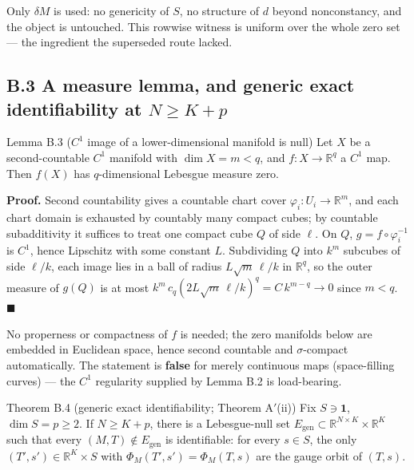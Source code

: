 Only $\delta M$ is used: no genericity of $S$, no structure of $d$ beyond nonconstancy, and the object is untouched. This rowwise witness is uniform over the whole zero set --- the ingredient the superseded route lacked.

\subsection{B.3 A measure lemma, and generic exact identifiability at \texorpdfstring{$N\ge K+p$}{N >= K+p}}

\begin{namedthm}{Lemma B.3 ($C^1$ image of a lower-dimensional manifold is null)}
Let $X$ be a second-countable $C^1$ manifold with $\dim X=m<q$, and $f:X\to\mathbb R^q$ a $C^1$ map. Then $f(X)$ has $q$-dimensional Lebesgue measure zero.
\end{namedthm}

\noindent\textbf{Proof.} Second countability gives a countable chart cover $\varphi_i:U_i\to\mathbb R^m$, and each chart domain is exhausted by countably many compact cubes; by countable subadditivity it suffices to treat one compact cube $Q$ of side $\ell$. On $Q$, $g=f\circ\varphi_i^{-1}$ is $C^1$, hence Lipschitz with some constant $L$. Subdividing $Q$ into $k^m$ subcubes of side $\ell/k$, each image lies in a ball of radius $L\sqrt m\,\ell/k$ in $\mathbb R^q$, so the outer measure of $g(Q)$ is at most $k^m\,c_q(2L\sqrt m\,\ell/k)^q=C\,k^{m-q}\to0$ since $m<q$. \hfill$\blacksquare$

No properness or compactness of $f$ is needed; the zero manifolds below are embedded in Euclidean space, hence second countable and $\sigma$-compact automatically. The statement is \textbf{false} for merely continuous maps (space-filling curves) --- the $C^1$ regularity supplied by Lemma B.2 is load-bearing.

\begin{namedthm}{Theorem B.4 (generic exact identifiability; Theorem A$'$(ii))}
Fix $S\ni\mathbf 1$, $\dim S=p\ge2$. If $N\ge K+p$, there is a Lebesgue-null set $E_{\mathrm{gen}}\subset\mathbb R^{N\times K}\times\mathbb R^K$ such that every $(M,T)\notin E_{\mathrm{gen}}$ is identifiable: for every $s\in S$, the only $(T',s')\in\mathbb R^K\times S$ with $\Phi_M(T',s')=\Phi_M(T,s)$ are the gauge orbit of $(T,s)$.
\end{namedthm}

